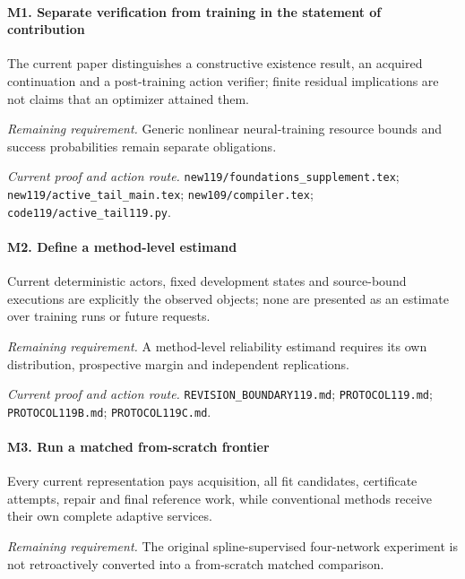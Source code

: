 \paragraph{M1. Separate verification from training in the statement of contribution}

The current paper distinguishes a constructive existence result, an acquired continuation and a post-training action verifier; finite residual implications are not claims that an optimizer attained them.

\par\emph{Remaining requirement.} Generic nonlinear neural-training resource bounds and success probabilities remain separate obligations.

\par\emph{Current proof and action route.} \nolinkurl{new119/foundations_supplement.tex}; \nolinkurl{new119/active_tail_main.tex}; \nolinkurl{new109/compiler.tex}; \nolinkurl{code119/active_tail119.py}.

\paragraph{M2. Define a method-level estimand}

Current deterministic actors, fixed development states and source-bound executions are explicitly the observed objects; none are presented as an estimate over training runs or future requests.

\par\emph{Remaining requirement.} A method-level reliability estimand requires its own distribution, prospective margin and independent replications.

\par\emph{Current proof and action route.} \nolinkurl{REVISION_BOUNDARY119.md}; \nolinkurl{PROTOCOL119.md}; \nolinkurl{PROTOCOL119B.md}; \nolinkurl{PROTOCOL119C.md}.

\paragraph{M3. Run a matched from-scratch frontier}

Every current representation pays acquisition, all fit candidates, certificate attempts, repair and final reference work, while conventional methods receive their own complete adaptive services.

\par\emph{Remaining requirement.} The original spline-supervised four-network experiment is not retroactively converted into a from-scratch matched comparison.

